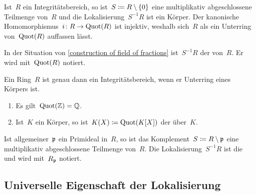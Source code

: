 \begin{example}
  \label{construction of field of fractions}
  Ist~$R$ ein Integritätsbereich, so ist~$S \coloneqq R \setminus \{ 0 \}$ eine multiplikativ abgeschlossene Teilmenge von~$R$ und die Lokalisierung~$S^{-1} R$ ist ein Körper.
  Der kanonische Homomorphismus~$i \colon R \to \Quot(R)$ ist injektiv, weshalb sich~$R$ als ein Unterring von~$\operatorname{Quot}(R)$ auffassen lässt.
\end{example}

\begin{definition}
  In der Situation von \cref{construction of field of fractions} ist~$S^{-1} R$ der  von~$R$.
  Er wird mit~$\operatorname{Quot}(R)$ notiert.
\end{definition}

\begin{corollary}
  Ein Ring~$R$ ist genau dann ein Integritätsbereich, wenn er Unterring eines Körpers ist.
\end{corollary}

\begin{example}
  \leavevmode
  \begin{enumerate}
    \item
      Es gilt~$\operatorname{Quot}(\mathbb{Z}) = \mathbb{Q}$.
    \item
      Ist~$K$ ein Körper, so ist~$K(X) \coloneqq \operatorname{Quot}(K[X])$ der  über~$K$.
  \end{enumerate}
\end{example}

\begin{example}
  Ist allgemeiner~$\mathfrak{p}$ ein Primideal in~$R$, so ist das Komplement~$S \coloneqq R \setminus \mathfrak{p}$ eine multiplikativ abgeschlossene Teilmenge von~$R$.
  Die Lokalisierung~$S^{-1} R$ ist die  und wird mit~$R_{\mathfrak{p}}$ notiert.
\end{example}




\subsection{Universelle Eigenschaft der Lokalisierung}

